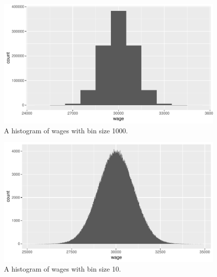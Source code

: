 \documentclass[]{book}\usepackage[]{graphicx}\usepackage[]{color}
\makeatletter
\def\maxwidth{ %
  \ifdim\Gin@nat@width>\linewidth
    \linewidth
  \else
    \Gin@nat@width
  \fi
}
\newenvironment{knitrout}{}{} %
\makeatother
\begin{document}
\begin{knitrout}
\color{fgcolor}\begin{figure}

{\centering \includegraphics[width=\maxwidth]{figure/histbin1-1} 

}

\caption[A histogram of wages with bin size 1000]{A histogram of wages with bin size 1000.}\label{fig:histbin1}
\end{figure}


\end{knitrout}

\begin{knitrout}
\color{fgcolor}\begin{figure}

{\centering \includegraphics[width=\maxwidth]{figure/histbin2-1} 

}

\caption[A histogram of wages with bin size 10]{A histogram of wages with bin size 10.}\label{fig:histbin2}
\end{figure}


\end{knitrout}
\end{document}
